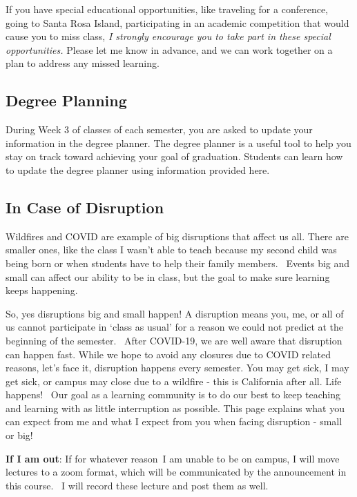 \documentclass[
  letterpaper,
  DIV=11,
  numbers=noendperiod]{scrartcl}
\begin{document}
If you have special educational opportunities, like traveling for a
conference, going to Santa Rosa Island, participating in an academic
competition that would cause you to miss class, \emph{I strongly
encourage you to take part in these special opportunities.} Please let
me know in advance, and we can work together on a plan to address any
missed learning.

\subsection{Degree Planning}\label{degree-planning}

During Week 3 of classes of each semester, you are asked to update your
information in the degree planner. The degree planner is a useful tool
to help you stay on track toward achieving your goal of graduation.
Students can learn how to update the degree planner using information
provided here.

\subsection{In Case of Disruption}\label{in-case-of-disruption}

Wildfires and COVID are example of big disruptions that affect us all.
There are smaller ones, like the class I wasn't able to teach because my
second child was being born or when students have to help their family
members.~ Events big and small can affect our ability to be in class,
but the goal to make sure learning keeps happening.

So, yes disruptions big and small happen! A disruption means you, me, or
all of us cannot participate in `class as usual' for a reason we could
not predict at the beginning of the semester.~ After COVID-19, we are
well aware that disruption can happen fast. While we hope to avoid any
closures due to COVID related reasons, let's face it, disruption happens
every semester. You may get sick, I may get sick, or campus may close
due to a wildfire - this is California after all. Life happens!~ Our
goal as a learning community is to do our best to keep teaching and
learning with as little interruption as possible. This page explains
what you can expect from me and what I expect from you when facing
disruption - small or big!~

\textbf{If I am out}: If for whatever reason~I am unable to be on
campus, I will move lectures to a zoom format, which will be
communicated by the announcement in this course.~ I will record these
lecture and post them as well.
\end{document}
